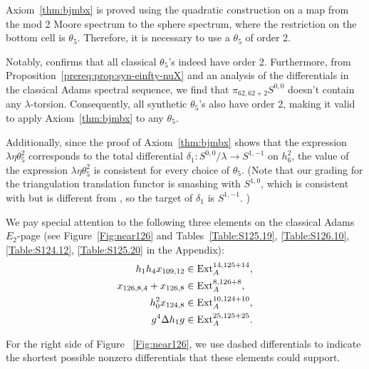 \begin{remark} \label{rem:theta5choice}
    Axiom~\ref{thm:bjmbx} is proved using the quadratic construction  on a map from the mod 2 Moore spectrum to the sphere spectrum, where the restriction on the bottom cell is $\theta_5$. Therefore, it is necessary to use a $\theta_5$ of order 2. 
    
    Notably, \cite{Xu, IWX} confirms that all classical $\theta_5$'s indeed have order 2. Furthermore, from Proposition~\ref{prereq:prop:syn-einfty-nuX} and an analysis of the differentials in the classical Adams spectral sequence, we find that $\pi_{62,62+2}S^{0,0}$ doesn't contain any $\lambda$-torsion. Consequently, all synthetic $\theta_5$'s also have order 2, making it valid to apply Axiom~\ref{thm:bjmbx} to any $\theta_5$. 
    
    Additionally, since the proof of Axiom~\ref{thm:bjmbx} shows that the expression $\lambda \eta \theta_5^2$ corresponds to the total differential $\delta_1: S^{0,0}/\lambda \rightarrow S^{1,-1}$ on $h_6^2$, the value of the expression $\lambda \eta \theta_5^2$ is consistent for every choice of $\theta_5$.  (Note that our grading for the triangulation translation functor is smashing with $S^{1,0}$, which is consistent with \cite[Appendix A]{BHS} but is different from \cite[Section 7]{BurklundXu}, so the target of $\delta_1$ is $S^{1,-1}$. )
\end{remark}

We pay special attention to the following three elements on the classical Adams $E_2$-page (see Figure~\ref{Fig:near126} and Tables~\ref{Table:S125.19}, \ref{Table:S126.10}, \ref{Table:S124.12}, \ref{Table:S125.20} in the Appendix): 
\begin{align*}
    h_1h_4x_{109,12} & \in \mathrm{Ext}_A^{14, 125+14}, \\
    x_{126,8,4} + x_{126,8} & \in \mathrm{Ext}_A^{8, 126+8}, \\
    h_0^2x_{124,8} & \in \mathrm{Ext}_A^{10, 124+10},\\
    g^4\Delta h_1g & \in \mathrm{Ext}_A^{25,125+25}.
\end{align*}

For the right side of Figure ~\ref{Fig:near126}, we use dashed differentials to indicate the shortest possible nonzero differentials that these elements could support.

{

}


